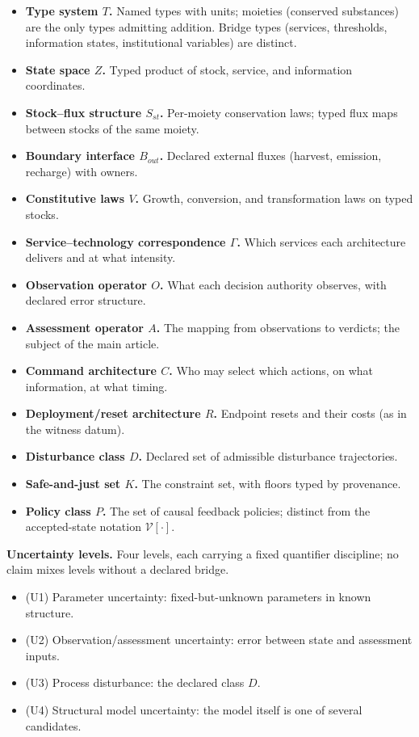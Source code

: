 \documentclass[preprint,11pt,authoryear]{elsarticle}
\theoremstyle{remark}
\begin{document}
\begin{itemize}[leftmargin=2em]
\item \textbf{Type system $T$.} Named types with units; moieties (conserved substances) are the only types admitting addition. Bridge types (services, thresholds, information states, institutional variables) are distinct.
\item \textbf{State space $Z$.} Typed product of stock, service, and information coordinates.
\item \textbf{Stock--flux structure $S_{st}$.} Per-moiety conservation laws; typed flux maps between stocks of the same moiety.
\item \textbf{Boundary interface $B_{out}$.} Declared external fluxes (harvest, emission, recharge) with owners.
\item \textbf{Constitutive laws $V$.} Growth, conversion, and transformation laws on typed stocks.
\item \textbf{Service--technology correspondence $\Gamma$.} Which services each architecture delivers and at what intensity.
\item \textbf{Observation operator $O$.} What each decision authority observes, with declared error structure.
\item \textbf{Assessment operator $A$.} The mapping from observations to verdicts; the subject of the main article.
\item \textbf{Command architecture $C$.} Who may select which actions, on what information, at what timing.
\item \textbf{Deployment/reset architecture $R$.} Endpoint resets and their costs (as in the witness datum).
\item \textbf{Disturbance class $D$.} Declared set of admissible disturbance trajectories.
\item \textbf{Safe-and-just set $K$.} The constraint set, with floors typed by provenance.
\item \textbf{Policy class $P$.} The set of causal feedback policies; distinct from the accepted-state notation $\mathcal{V}[\cdot]$.
\end{itemize}

\textbf{Uncertainty levels.} Four levels, each carrying a fixed quantifier discipline; no claim mixes levels without a declared bridge.

\begin{itemize}[leftmargin=2em]
\item (U1) Parameter uncertainty: fixed-but-unknown parameters in known structure.
\item (U2) Observation/assessment uncertainty: error between state and assessment inputs.
\item (U3) Process disturbance: the declared class $D$.
\item (U4) Structural model uncertainty: the model itself is one of several candidates.
\end{itemize}
\end{document}
